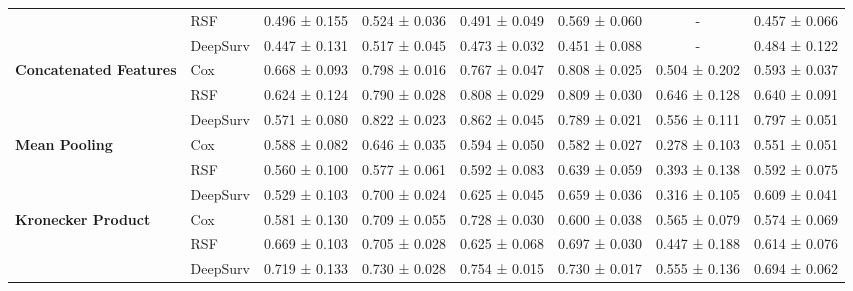 \begin{sidewaystable}[htbp]
\begin{tabular}{@{}llcccccc@{}}
        & RSF & 0.496 ± 0.155 & 0.524 ± 0.036 & 0.491 ± 0.049 & 0.569 ± 0.060 & - & 0.457 ± 0.066 \\
        & DeepSurv & 0.447 ± 0.131 & 0.517 ± 0.045 & 0.473 ± 0.032 & 0.451 ± 0.088 & - & 0.484 ± 0.122 \\
        \midrule
        \multirow{3}{*}{\textbf{Concatenated Features}} & Cox & 0.668 ± 0.093 & 0.798 ± 0.016 & 0.767 ± 0.047 & 0.808 ± 0.025 & 0.504 ± 0.202 & 0.593 ± 0.037 \\
        & RSF & 0.624 ± 0.124 & 0.790 ± 0.028 & 0.808 ± 0.029 & 0.809 ± 0.030 & 0.646 ± 0.128 & 0.640 ± 0.091 \\
        & DeepSurv & 0.571 ± 0.080 & 0.822 ± 0.023 & 0.862 ± 0.045 & 0.789 ± 0.021 & 0.556 ± 0.111 & 0.797 ± 0.051 \\
        \midrule
        \multirow{3}{*}{\textbf{Mean Pooling}} & Cox & 0.588 ± 0.082 & 0.646 ± 0.035 & 0.594 ± 0.050 & 0.582 ± 0.027 & 0.278 ± 0.103 & 0.551 ± 0.051 \\
        & RSF & 0.560 ± 0.100 & 0.577 ± 0.061 & 0.592 ± 0.083 & 0.639 ± 0.059 & 0.393 ± 0.138 & 0.592 ± 0.075 \\
        & DeepSurv & 0.529 ± 0.103 & 0.700 ± 0.024 & 0.625 ± 0.045 & 0.659 ± 0.036 & 0.316 ± 0.105 & 0.609 ± 0.041 \\
        \midrule
        \multirow{3}{*}{\textbf{Kronecker Product}} & Cox & 0.581 ± 0.130 & 0.709 ± 0.055 & 0.728 ± 0.030 & 0.600 ± 0.038 & 0.565 ± 0.079 & 0.574 ± 0.069 \\
        & RSF & 0.669 ± 0.103 & 0.705 ± 0.028 & 0.625 ± 0.068 & 0.697 ± 0.030 & 0.447 ± 0.188 & 0.614 ± 0.076 \\
        & DeepSurv & 0.719 ± 0.133 & 0.730 ± 0.028 & 0.754 ± 0.015 & 0.730 ± 0.017 & 0.555 ± 0.136 & 0.694 ± 0.062 \\
        \bottomrule
    \end{tabular}
\end{sidewaystable}